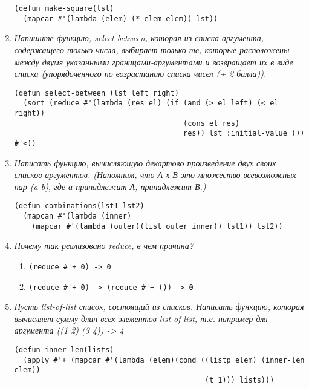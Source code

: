 \begin{enumerate}[wide=0pt]
\begin{lstlisting}
(defun make-square(lst)
  (mapcar #'(lambda (elem) (* elem elem)) lst))
\end{lstlisting}
\item \textit{Напишите функцию, select-between, которая из списка-аргумента, содержащего только числа, выбирает только те, которые расположены между двумя указанными границами-аргументами и возвращает их в виде списка (упорядоченного по возрастанию списка чисел (+ 2 балла)).}
\begin{lstlisting}
(defun select-between (lst left right)
  (sort (reduce #'(lambda (res el) (if (and (> el left) (< el right))
                                       (cons el res)
	                                   res)) lst :initial-value ()) #'<))
\end{lstlisting}
\item \textit{Написать функцию, вычисляющую декартово произведение двух своих списков-аргументов. (Напомним, что А х В это множество всевозможных пар (a b), где а принадлежит А, принадлежит В.)}
\begin{lstlisting}
(defun combinations(lst1 lst2)
  (mapcan #'(lambda (inner)
    (mapcar #'(lambda (outer)(list outer inner)) lst1)) lst2))
\end{lstlisting}
\item \textit{Почему так реализовано reduce, в чем причина?}
\begin{enumerate}
	\item \lstinline|(reduce #'+ 0) -> 0|
	\item \lstinline|(reduce #'+ 0) -> (reduce #'+ ()) -> 0|
\end{enumerate}
\item \textit{Пусть list-of-list список, состоящий из списков. Написать функцию, которая вычисляет сумму длин всех элементов list-of-list, т.е. например для аргумента ((1 2) (3 4)) -> 4}
\begin{lstlisting}
(defun inner-len(lists)
  (apply #'+ (mapcar #'(lambda (elem)(cond ((listp elem) (inner-len elem))
                                            (t 1))) lists)))
\end{lstlisting}
\end{enumerate}